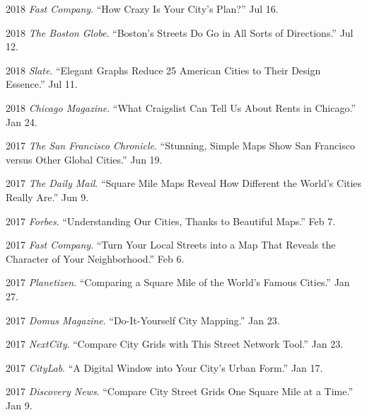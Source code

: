 \documentclass{academiccv}
\begin{document}
\begin{tablist}

\item 2018 \tab \textit{Fast Company}. \enquote{How Crazy Is Your City's Plan?} Jul 16.

\item 2018 \tab \textit{The Boston Globe}. \enquote{Boston's Streets Do Go in All Sorts of Directions.} Jul 12.

\item 2018 \tab \textit{Slate}. \enquote{Elegant Graphs Reduce 25 American Cities to Their Design Essence.} Jul 11.	

\item 2018 \tab \textit{Chicago Magazine}. \enquote{What Craigslist Can Tell Us About Rents in Chicago.} Jan 24.
	
\item 2017 \tab \textit{The San Francisco Chronicle}. \enquote{Stunning, Simple Maps Show San Francisco versus Other Global Cities.} Jun 19.

\item 2017 \tab \textit{The Daily Mail}. \enquote{Square Mile Maps Reveal How Different the World's Cities Really Are.} Jun 9.

\item 2017 \tab \textit{Forbes}. \enquote{Understanding Our Cities, Thanks to Beautiful Maps.} Feb 7.

\item 2017 \tab \textit{Fast Company}. \enquote{Turn Your Local Streets into a Map That Reveals the Character of Your Neighborhood.} Feb 6.

\item 2017 \tab \textit{Planetizen}. \enquote{Comparing a Square Mile of the World's Famous Cities.} Jan 27.

\item 2017 \tab \textit{Domus Magazine}. \enquote{Do-It-Yourself City Mapping.} Jan 23.

\item 2017 \tab \textit{NextCity}. \enquote{Compare City Grids with This Street Network Tool.} Jan 23.

\item 2017 \tab \textit{CityLab}. \enquote{A Digital Window into Your City's Urban Form.} Jan 17.

\item 2017 \tab \textit{Discovery News}. \enquote{Compare City Street Grids One Square Mile at a Time.} Jan 9.


\end{tablist}
\end{document}
